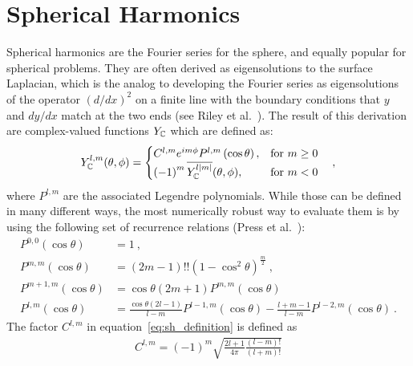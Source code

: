 \section{Spherical Harmonics}
\label{sec:sh}

Spherical harmonics are the Fourier series for the sphere, and equally popular for spherical problems. They are often derived as eigensolutions to the surface Laplacian, which is the analog to developing the Fourier series as eigensolutions of the operator $(d/dx)^2$ on a finite line with the boundary conditions that $y$ and $dy/dx$ match at the two ends (see Riley et al.~\cite{Riley2006}). The result of this derivation are complex-valued functions $Y_{\mathbb{C}}$ which are defined as:
\begin{align}
\label{eq:sh_definition}
Y_{\mathbb{C}}^{l,m}(\theta, \phi)=
\begin{cases}
C^{l,m}e^{im\phi}P^{l,m}\left(\operatorname{cos}\theta\right), & \text{for $m\ge0$}\\
\left(-1\right)^m\overline{Y_{\mathbb{C}}^{l\left|m\right|}}(\theta, \phi), & \text{for $m<0$}
\end{cases}
\quad ,
\end{align}
where $P^{l,m}$ are the associated Legendre polynomials. While those can be defined in many different ways, the most numerically robust way to evaluate them is by using the following set of recurrence relations (Press et al.~\cite{Press07}):
\begin{align}
P^{0,0}\left(\operatorname{cos}\theta\right) &=
1
\  ,
\nonumber
\\
P^{m,m}\left(\operatorname{cos}\theta\right) &=
\left(2m-1\right)!!\left(1-\operatorname{cos}^2\theta\right)^\frac{m}{2}
\  ,
\nonumber
\\
P^{m+1,m}\left(\operatorname{cos}\theta\right) &=
\operatorname{cos}\theta\left(2m+1\right)P^{m,m}\left(\operatorname{cos}\theta\right)
\ 
\nonumber
\\
P^{l,m}\left(\operatorname{cos}\theta\right) &=
\frac{\operatorname{cos}\theta\left(2l-1\right)}{l-m}
P^{l-1,m}\left(\operatorname{cos}\theta\right)
-
\frac{l+m-1}{l-m}
P^{l-2,m}\left(\operatorname{cos}\theta\right)
\  .
\label{eq:sh_Plm}
\end{align}
The factor $C^{l,m}$ in equation~\ref{eq:sh_definition} is defined as
\begin{align}
\label{eq:sh_definition_C}
C^{l,m}=(-1)^m\sqrt{\frac{2l+1}{4\pi}\frac{(l-m)!}{(l+m)!}}
\end{align}
